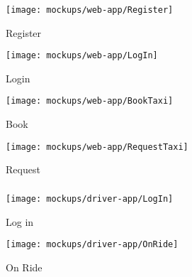 \newpage
\subsubsection{ }
\vfill
\begin{figure}[h!t]
\caption{Register}
\texttt{[image: mockups/web-app/Register]}
\centering
\end{figure}
\vfill
\clearpage

\newpage
\vfill
\begin{figure}[h!t]
\caption{Login}
\texttt{[image: mockups/web-app/LogIn]}
\centering
\end{figure}
\vfill
\clearpage

\newpage
\vfill
\begin{figure}[h!t]
\caption{Book}
\texttt{[image: mockups/web-app/BookTaxi]}
\centering
\end{figure}
\vfill
\clearpage

\newpage
\vfill
\begin{figure}[h!t]
\caption{Request}
\texttt{[image: mockups/web-app/RequestTaxi]}
\centering
\end{figure}
\vfill
\clearpage

\newpage
\subsubsection{ }
\vfill
\begin{figure*}[h!t]
    \centering
    \begin{subfigure}[h!t]{0.25\paperwidth}
            \texttt{[image: mockups/driver-app/LogIn]}
            \caption{Log in}
    \end{subfigure}
    \hspace{0.05\paperwidth}
    \begin{subfigure}[h!t]{0.25\paperwidth}
            \texttt{[image: mockups/driver-app/OnRide]}
            \caption{On Ride}
    \end{subfigure}
\end{figure*}
\vfill
\clearpage


